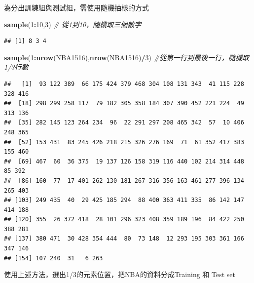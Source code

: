 \documentclass[]{book}
\newenvironment{Shaded}{\begin{snugshade}}{\end{snugshade}}
\newcommand{\CommentTok}[1]{\textcolor[rgb]{0.56,0.35,0.01}{\textit{#1}}}
\newcommand{\DecValTok}[1]{\textcolor[rgb]{0.00,0.00,0.81}{#1}}
\newcommand{\KeywordTok}[1]{\textcolor[rgb]{0.13,0.29,0.53}{\textbf{#1}}}
\newcommand{\NormalTok}[1]{#1}
\newcommand{\OperatorTok}[1]{\textcolor[rgb]{0.81,0.36,0.00}{\textbf{#1}}}
\begin{document}
為分出訓練組與測試組，需使用隨機抽樣的方式

\begin{Shaded}
\begin{Highlighting}[]
\KeywordTok{sample}\NormalTok{(}\DecValTok{1}\OperatorTok{:}\DecValTok{10}\NormalTok{,}\DecValTok{3}\NormalTok{) }\CommentTok{# 從1到10，隨機取三個數字}
\end{Highlighting}
\end{Shaded}

\begin{verbatim}
## [1] 8 3 4
\end{verbatim}

\begin{Shaded}
\begin{Highlighting}[]
\KeywordTok{sample}\NormalTok{(}\DecValTok{1}\OperatorTok{:}\KeywordTok{nrow}\NormalTok{(NBA1516),}\KeywordTok{nrow}\NormalTok{(NBA1516)}\OperatorTok{/}\DecValTok{3}\NormalTok{) }\CommentTok{#從第一行到最後一行，隨機取1/3行數}
\end{Highlighting}
\end{Shaded}

\begin{verbatim}
##   [1]  93 122 389  66 175 424 379 468 304 108 131 343  41 115 228 328 416
##  [18] 298 299 258 117  79 182 305 358 184 307 390 452 221 224  49 313 136
##  [35] 282 145 123 264 234  96  22 291 297 208 465 342  57  10 406 248 365
##  [52] 153 431  83 245 426 218 215 326 276 169  71  61 352 417 383 155 460
##  [69] 467  60  36 375  19 137 126 158 319 116 440 102 214 314 448  85 392
##  [86] 160  77  17 401 262 130 181 267 316 356 163 461 277 396 134 265 403
## [103] 249 435  40  29 425 185 294  88 400 363 411 335  86 142 147 414 188
## [120] 355  26 372 418  28 101 296 323 408 359 189 196  84 422 250 388 281
## [137] 380 471  30 428 354 444  80  73 148  12 293 195 303 361 166 347 146
## [154] 107 240  31   6 263
\end{verbatim}

使用上述方法，選出1/3的元素位置，把NBA的資料分成Training 和 Test set

\begin{Shaded}
\end{Shaded}
\end{document}

